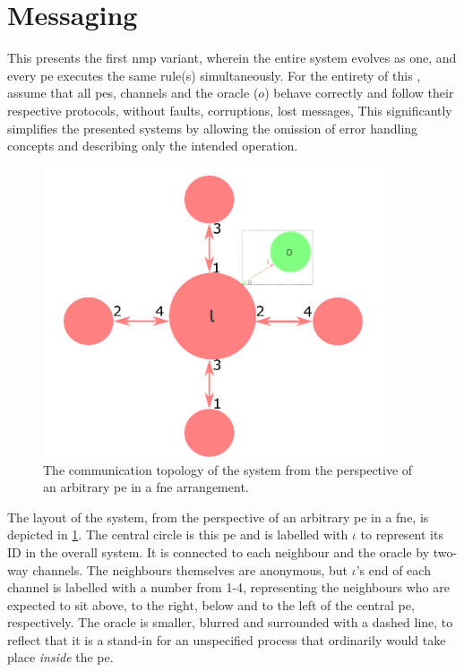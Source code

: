 \section{\label{sec:nmp:globalsync}\texorpdfstring{}{Globally-synchronous} Messaging}

\cpresetrulenumber

This  presents the first \gls{nmp} variant, wherein the entire system evolves as one, and every \gls{pe} executes the same rule(s) simultaneously.  For the entirety of this , assume that all \glspl{pe}, channels and the oracle (\(o\)) behave correctly and follow their respective protocols, without faults, corruptions, lost messages, \etc{}  This significantly simplifies the presented systems by allowing the omission of error handling concepts and describing only the intended operation.

\begin{figure}
    \centering
    \includegraphics[width=0.9\textwidth]{chapters/nmp/images/iota_proxels_oracle_v7.pdf}
    \caption[The communication topology of a  system from the perspective of an arbitrary  in a \gls{fne} arrangement]{The communication topology of the system from the perspective of an arbitrary \gls{pe} in a \gls{fne} arrangement.}
    \label{fig:nmp:iota_proxels_environment_oracle}
\end{figure}

The layout of the system, from the perspective of an arbitrary \gls{pe} in a \gls{fne}, is depicted in \cref{fig:nmp:iota_proxels_environment_oracle}.  The central circle is this \gls{pe} and is labelled with \(\iota\) to represent its ID in the overall system.  It is connected to each neighbour and the oracle by two-way channels.  The neighbours themselves are anonymous, but \(\iota\)'s end of each channel is labelled with a number from 1-4, representing the neighbours who are expected to sit above, to the right, below and to the left of the central \gls{pe}, respectively.  The oracle is smaller, blurred and surrounded with a dashed line, to reflect that it is a stand-in for an unspecified process that ordinarily would take place \emph{inside} the \gls{pe}.

